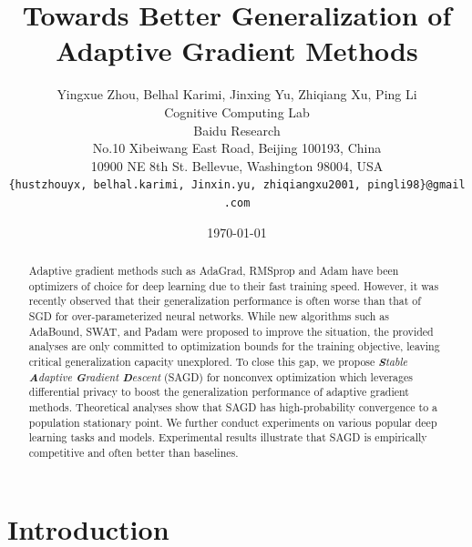 \documentclass[11pt]{article}
\begin{document}
\title{Towards Better Generalization of Adaptive Gradient Methods}

\author{
  Yingxue Zhou, Belhal Karimi, Jinxing Yu, Zhiqiang Xu, Ping Li\\
  Cognitive Computing Lab\\ 
  Baidu Research\\
  No.10 Xibeiwang East Road, Beijing 100193, China\\  
  10900 NE 8th St. Bellevue, Washington 98004, USA\\
  \texttt{\{hustzhouyx,\ belhal.karimi,\ Jinxin.yu,\ zhiqiangxu2001,\  pingli98\}@gmail.com}
}

\date{\today}

\maketitle


\begin{abstract}
Adaptive gradient methods such as AdaGrad, RMSprop and Adam have been optimizers of choice for deep learning due to their fast training speed. However, it was recently observed that their generalization performance is often worse than that of SGD for over-parameterized neural networks. While new algorithms such as AdaBound, SWAT, and Padam were proposed to improve the situation, the provided analyses are only committed to optimization bounds for the training objective, leaving critical generalization capacity unexplored. To close this gap, we propose \textit{\textbf{S}table \textbf{A}daptive \textbf{G}radient \textbf{D}escent} (\textsc{SAGD}) for nonconvex optimization which leverages differential privacy to boost the generalization performance of adaptive gradient methods. 
Theoretical analyses show that \textsc{SAGD} has high-probability convergence to a population stationary point. We further conduct experiments on various popular deep learning tasks and models. Experimental results illustrate that \textsc{SAGD} is empirically competitive and often better than baselines. 
\end{abstract}


\section{Introduction}
\end{document}
